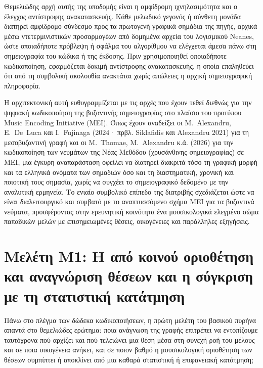 \documentclass[11pt,a4paper]{article}
\begin{document}
Θεμελιώδης αρχή αυτής της υποδομής είναι η αμφίδρομη ιχνηλασιμότητα και ο έλεγχος αντίστροφης ανακατασκευής. Κάθε μελωδικό γεγονός ή σύνθετη μονάδα διατηρεί αμφίδρομο σύνδεσμο προς τα πρωτογενή γραφικά σημάδια της πηγής, αρχικά μέσω ντετερμινιστικών προσαρμογέων από δομημένα αρχεία του λογισμικού Neanes, ώστε οποιαδήποτε πρόβλεψη ή σφάλμα του αλγορίθμου να ελέγχεται άμεσα πάνω στη σημειογραφία του κώδικα ή της έκδοσης. Πριν χρησιμοποιηθεί οποιαδήποτε κωδικοποίηση, εφαρμόζεται δοκιμή αντίστροφης ανακατασκευής, η οποία επαληθεύει ότι από τη συμβολική ακολουθία ανακτάται χωρίς απώλειες η αρχική σημειογραφική πληροφορία.

Η αρχιτεκτονική αυτή ευθυγραμμίζεται με τις αρχές που έχουν τεθεί διεθνώς για την ψηφιακή κωδικοποίηση της βυζαντινής σημειογραφίας στο πλαίσιο του προτύπου Music Encoding Initiative (MEI). Όπως έχουν αναδείξει οι M.~Alexandru, E.~De~Luca και I.~Fujinaga (2024· πρβλ. Siklafidis και Alexandru 2021) για τη μεσοβυζαντινή γραφή και οι M.~Thomae, M.~Alexandru κ.ά. (2026) για την κωδικοποίηση των νευμάτων της Νέας Μεθόδου (χρυσάνθινης σημειογραφίας) σε MEI, μια έγκυρη αναπαράσταση οφείλει να διατηρεί διακριτά τόσο τη γραφική μορφή και τα ελληνικά ονόματα των σημαδιών όσο και τη διαστηματική, χρονική και ποιοτική τους σημασία, χωρίς να συγχέει το σημειογραφικό δεδομένο με την αναλυτική ερμηνεία. Το ενιαίο συμβολικό επίπεδο της διατριβής σχεδιάζεται ώστε να είναι διαλειτουργικό και συμβατό με το αναπτυσσόμενο σχήμα MEI για τα βυζαντινά νεύματα, προσφέροντας στην ερευνητική κοινότητα ένα μουσικολογικά ελεγμένο σώμα παπαδικών μελών με επισημειωμένες θέσεις, οικογένειες και παράλληλες εξηγήσεις.

\section{Μελέτη Μ1: Η από κοινού οριοθέτηση και αναγνώριση θέσεων και η σύγκριση με τη στατιστική κατάτμηση}

Πάνω στο πλέγμα των δώδεκα κωδικοποιήσεων, η πρώτη μελέτη του βασικού πυρήνα απαντά στο θεμελιώδες ερώτημα: ποια ανάγνωση της γραφής επιτρέπει να εντοπίζουμε ταυτόχρονα πού αρχίζει και πού τελειώνει μια θέση μέσα στη συνεχή ροή του μέλους και σε ποια οικογένεια ανήκει, και σε ποιον βαθμό η μουσικολογική οριοθέτηση των θέσεων συμπίπτει ή αποκλίνει από μια καθαρά στατιστική ή επιφανειακή κατάτμηση;
\end{document}

